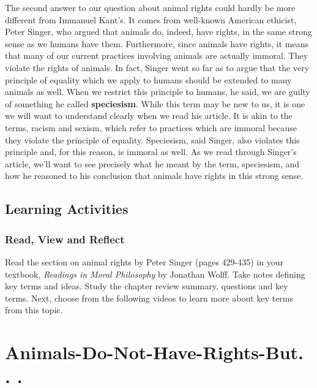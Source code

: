 \documentclass[
]{book}
\begin{document}
The second answer to our question about animal rights could hardly be more different from Immanuel Kant's. It comes from well-known American ethicist, Peter Singer, who argued that animals do, indeed, have rights, in the same strong sense as we humans have them. Furthermore, since animals have rights, it means that many of our current practices involving animals are actually immoral. They violate the rights of animals.
In fact, Singer went so far as to argue that the very principle of equality which we apply to humans should be extended to many animals as well. When we restrict this principle to humans, he said, we are guilty of something he called \textbf{speciesism}.
While this term may be new to us, it is one we will want to understand clearly when we read his article. It is akin to the terms, racism and sexism, which refer to practices which are immoral because they violate the principle of equality. Speciesism, said Singer, also violates this principle and, for this reason, is immoral as well.
As we read through Singer's article, we'll want to see precisely what he meant by the term, speciesism, and how he reasoned to his conclusion that animals have rights in this strong sense.

\hypertarget{learning-activities-17}{%
\subsection*{Learning Activities}\label{learning-activities-17}}

\begin{reflect}
\hypertarget{read-view-and-reflect-22}{%
\subsubsection*{Read, View and Reflect}\label{read-view-and-reflect-22}}

Read the section on animal rights by Peter Singer (pages 429-435) in your textbook, \emph{Readings in Moral Philosophy} by Jonathan Wolff. Take notes defining key terms and ideas. Study the chapter review summary, questions and key terms.
Next, choose from the following videos to learn more about key terms from this topic.
\end{reflect}

\hypertarget{animals-do-not-have-rights-but.-.-.}{%
\section*{Animals-Do-Not-Have-Rights-But. . .}\label{animals-do-not-have-rights-but.-.-.}}
\end{document}
